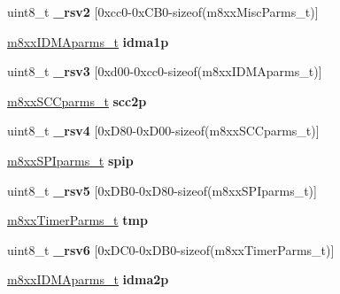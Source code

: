 \begin{DoxyCompactItemize}
\mbox{\label{structm8xx___a6711a8d1ef6088a3b9e63fa2dc863a44}} 
uint8\+\_\+t {\bfseries \+\_\+rsv2} \mbox{[}0xcc0-\/0x\+C\+B0-\/sizeof(m8xx\+Misc\+Parms\+\_\+t)\mbox{]}
\item 
\mbox{\label{structm8xx___a54c245c442478782c1c63e6b180d5a2d}} 
\mbox{\hyperlink{structm8xxIDMAparms__}{m8xx\+I\+D\+M\+Aparms\+\_\+t}} {\bfseries idma1p}
\item 
\mbox{\label{structm8xx___a6771c116472bfb0cbe0f670e3513b90f}} 
uint8\+\_\+t {\bfseries \+\_\+rsv3} \mbox{[}0xd00-\/0xcc0-\/sizeof(m8xx\+I\+D\+M\+Aparms\+\_\+t)\mbox{]}
\item 
\mbox{\label{structm8xx___a3b61ad472801cf34219d7f780e4d4b29}} 
\mbox{\hyperlink{structm8xxSCCparms__}{m8xx\+S\+C\+Cparms\+\_\+t}} {\bfseries scc2p}
\item 
\mbox{\label{structm8xx___a05a53c153d243d6a019726f9b3ac35d8}} 
uint8\+\_\+t {\bfseries \+\_\+rsv4} \mbox{[}0x\+D80-\/0x\+D00-\/sizeof(m8xx\+S\+C\+Cparms\+\_\+t)\mbox{]}
\item 
\mbox{\label{structm8xx___ac05c8d16b922ee522d2fe773f7238c5f}} 
\mbox{\hyperlink{structm8xxSPIparms__}{m8xx\+S\+P\+Iparms\+\_\+t}} {\bfseries spip}
\item 
\mbox{\label{structm8xx___a2b9dcb21490f97e75ac0d42789c413a2}} 
uint8\+\_\+t {\bfseries \+\_\+rsv5} \mbox{[}0x\+D\+B0-\/0x\+D80-\/sizeof(m8xx\+S\+P\+Iparms\+\_\+t)\mbox{]}
\item 
\mbox{\label{structm8xx___a9d7d117b6151313f3ce83509d83cc8dd}} 
\mbox{\hyperlink{structm8xxTimerParms__}{m8xx\+Timer\+Parms\+\_\+t}} {\bfseries tmp}
\item 
\mbox{\label{structm8xx___afe32e2dcedf266e1b474e638917f3a71}} 
uint8\+\_\+t {\bfseries \+\_\+rsv6} \mbox{[}0x\+D\+C0-\/0x\+D\+B0-\/sizeof(m8xx\+Timer\+Parms\+\_\+t)\mbox{]}
\item 
\mbox{\label{structm8xx___adac777327bc92c547fc9b4dc15bf14cf}} 
\mbox{\hyperlink{structm8xxIDMAparms__}{m8xx\+I\+D\+M\+Aparms\+\_\+t}} {\bfseries idma2p}

\end{DoxyCompactItemize}
